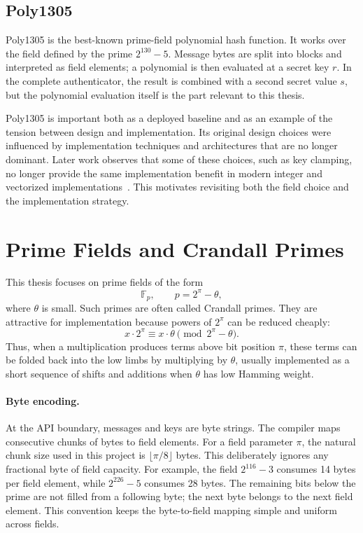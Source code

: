 \subsection{Poly1305}
\label{subsec:poly1305}

Poly1305 is the best-known prime-field polynomial hash function. It works over the field defined by the prime \(2^{130}-5\). Message bytes are split into blocks and interpreted as field elements; a polynomial is then evaluated at a secret key \(r\). In the complete authenticator, the result is combined with a second secret value \(s\), but the polynomial evaluation itself is the part relevant to this thesis.

Poly1305 is important both as a deployed baseline and as an example of the tension between design and implementation. Its original design choices were influenced by implementation techniques and architectures that are no longer dominant. Later work observes that some of these choices, such as key clamping, no longer provide the same implementation benefit in modern integer and vectorized implementations~\cite{degabriele2024sok}. This motivates revisiting both the field choice and the implementation strategy.

\section{Prime Fields and Crandall Primes}
\label{sec:prime-fields}

This thesis focuses on prime fields of the form
\[
    \mathbb{F}_p,\qquad p = 2^\pi - \theta,
\]
where \(\theta\) is small. Such primes are often called Crandall primes. They are attractive for implementation because powers of \(2^\pi\) can be reduced cheaply:
\[
    x \cdot 2^\pi \equiv x \cdot \theta \pmod{2^\pi - \theta}.
\]
Thus, when a multiplication produces terms above bit position \(\pi\), these terms can be folded back into the low limbs by multiplying by \(\theta\), usually implemented as a short sequence of shifts and additions when \(\theta\) has low Hamming weight.

\paragraph{Byte encoding.}
At the API boundary, messages and keys are byte strings. The compiler maps consecutive chunks of bytes to field elements. For a field parameter \(\pi\), the natural chunk size used in this project is \(\lfloor \pi/8 \rfloor\) bytes. This deliberately ignores any fractional byte of field capacity. For example, the field \(2^{116}-3\) consumes 14 bytes per field element, while \(2^{226}-5\) consumes 28 bytes. The remaining bits below the prime are not filled from a following byte; the next byte belongs to the next field element. This convention keeps the byte-to-field mapping simple and uniform across fields.

